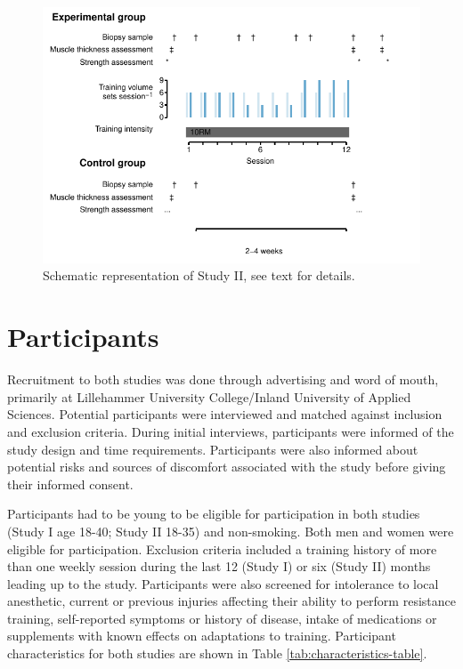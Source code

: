 \documentclass[twoside,10pt]{gihclass} %
\begin{document}
\begin{figure}

{\centering \includegraphics{thesis_files/figure-latex/study2-overview-1} 

}

\caption[Study II, schematic overview]{Schematic representation of Study II, see text for details. }\label{fig:study2-overview}
\end{figure}
\hypertarget{participants}{%
\section{Participants}\label{participants}}

Recruitment to both studies was done through advertising and word of mouth, primarily at Lillehammer University College/Inland University of Applied Sciences. Potential participants were interviewed and matched against inclusion and exclusion criteria. During initial interviews, participants were informed of the study design and time requirements. Participants were also informed about potential risks and sources of discomfort associated with the study before giving their informed consent.

Participants had to be young to be eligible for participation in both studies (Study I age 18-40; Study II 18-35) and non-smoking. Both men and women were eligible for participation. Exclusion criteria included a training history of more than one weekly session during the last 12 (Study I) or six (Study II) months leading up to the study. Participants were also screened for intolerance to local anesthetic, current or previous injuries affecting their ability to perform resistance training, self-reported symptoms or history of disease, intake of medications or supplements with known effects on adaptations to training.
Participant characteristics for both studies are shown in Table
\ref{tab:characteristics-table}.
\end{document}
